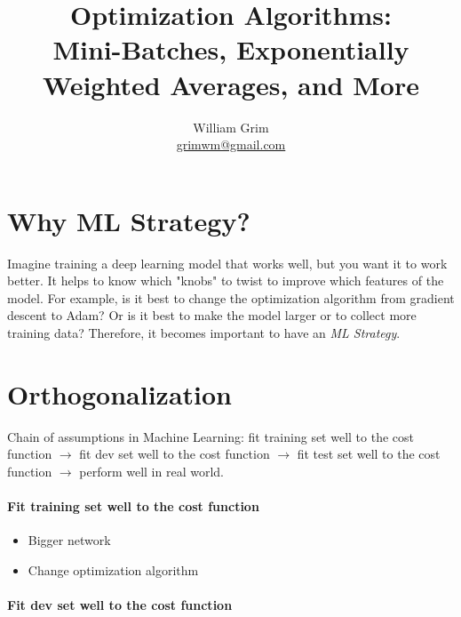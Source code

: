 \documentclass{article}
\begin{document}
\title {Optimization Algorithms:\\
Mini-Batches, Exponentially Weighted Averages, and More}
\author{William Grim \\ \href{mailto:grimwm@gmail.com}{grimwm@gmail.com}}

\maketitle

\tableofcontents

\begin{abstract}

\end{abstract}

\section{Why ML Strategy?}

Imagine training a deep learning model that works well, but you want it to work better.  It helps to know which "knobs" to twist to improve which features of the model.  For example, is it best to change the optimization algorithm from gradient descent to Adam?  Or is it best to make the model larger or to collect more training data?  Therefore, it becomes important to have an \textit{ML Strategy}.

\section{Orthogonalization}

Chain of assumptions in Machine Learning: fit training set well to the cost function $\rightarrow$ fit dev set well to the cost function $\rightarrow$ fit test set well to the cost function $\rightarrow$ perform well in real world.

\paragraph{Fit training set well to the cost function}

\begin{itemize}
\item Bigger network
\item Change optimization algorithm
\end{itemize}

\paragraph{Fit dev set well to the cost function}
\end{document}
